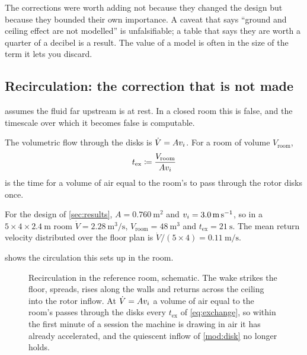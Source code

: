 \begin{finding}
The corrections were worth adding not because they changed the design but
because they bounded their own importance. A caveat that says ``ground and
ceiling effect are not modelled'' is unfalsifiable; a table that says they are
worth a quarter of a decibel is a result. The value of a model is often in the
size of the term it lets you discard.
\end{finding}

\subsection{Recirculation: the correction that is not made}

 assumes the fluid far upstream is at rest. In a closed room
this is false, and the timescale over which it becomes false is computable.

\begin{definition}
The volumetric flow through the disks is $\dot{V} = Av_i$. For a room of
volume $V_{\mathrm{room}}$,
\begin{equation}
  t_{\mathrm{ex}} \coloneqq \frac{V_{\mathrm{room}}}{Av_i}
  \label{eq:exchange}
\end{equation}
is the time for a volume of air equal to the room's to pass through the rotor
disks once.
\end{definition}

\begin{example}
For the design of \cref{sec:results}, $A=\SI{0.760}{\metre\squared}$ and
$v_i=\SI{3.0}{\metre\per\second}$, so in a
$5\times4\times\SI{2.4}{\metre}$ room
$\dot V = \SI{2.28}{\metre\cubed\per\second}$,
$V_{\mathrm{room}}=\SI{48}{\metre\cubed}$ and
$t_{\mathrm{ex}} = \SI{21}{\second}$. The mean return velocity distributed over
the floor plan is $\dot V/(5\times4) = \SI{0.11}{\metre\per\second}$.
\end{example}

 shows the circulation this sets up in the room.

\begin{figure}[tbp]
\centering

\caption{Recirculation in the reference room, schematic. The wake strikes the
floor, spreads, rises along the walls and returns across the ceiling into the
rotor inflow. At $\dot V=Av_i$ a volume of air equal to the room's passes
through the disks every $t_{\mathrm{ex}}$ of \cref{eq:exchange}, so within the
first minute of a session the machine is drawing in air it has already
accelerated, and the quiescent inflow of \cref{mod:disk} no longer holds.}
\label{fig:recirc}
\end{figure}

